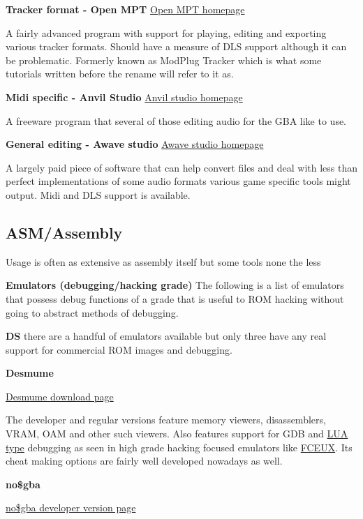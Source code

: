 \documentclass[
]{book}
\begin{document}
\textbf{Tracker format - Open MPT} \href{http://openmpt.org/}{Open MPT homepage}

A fairly advanced program with support for playing, editing and exporting various tracker formats. Should have a measure of DLS support although it can be problematic. Formerly known as ModPlug Tracker which is what some tutorials written before the rename will refer to it as.

\textbf{Midi specific - Anvil Studio} \href{http://www.anvilstudio.com/}{Anvil studio homepage}

A freeware program that several of those editing audio for the GBA like to use.

\textbf{General editing - Awave studio} \href{http://www.fmjsoft.com/awframe.html}{Awave studio homepage}

A largely paid piece of software that can help convert files and deal with less than perfect implementations of some audio formats various game specific tools might output. Midi and DLS support is available.

\hypertarget{asmassembly}{%
\subsection{ASM/Assembly}\label{asmassembly}}

Usage is often as extensive as assembly itself but some tools none the less

\textbf{Emulators (debugging/hacking grade)} The following is a list of emulators that possess debug functions of a grade that is useful to ROM hacking without going to abstract methods of debugging.

\textbf{DS} there are a handful of emulators available but only three have any real support for commercial ROM images and debugging.

\textbf{Desmume}

\href{http://desmume.org/download/}{Desmume download page}

The developer and regular versions feature memory viewers, disassemblers, VRAM, OAM and other such viewers. Also features support for GDB and \href{http://wiki.desmume.org/index.php?title=Faq\#What_is_this_Lua_stuff_I_see.3F}{LUA type} debugging as seen in high grade hacking focused emulators like \href{http://www.fceux.com/web/help/LuaScripting.html}{FCEUX}. Its cheat making options are fairly well developed nowadays as well.

\textbf{no\$gba}

\href{http://problemkaputt.de/gba-dev.htm}{no\$gba developer version page}
\end{document}
